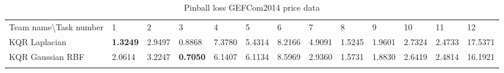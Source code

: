\begin{table}[!ht]
    \centering
    \caption{Pinball loss GEFCom2014 price data}
    \label{tab:pinball loss gefcom2014 price data}
    \begin{adjustbox}{width=\textwidth}
    \begin{tabular}{lllllllllllll}
      \toprule
      \midrule
      Team name\textbackslash Task number                       & 1                               & 2                                  & 3                               & 4                              & 5                              & 6       & 7                               & 8       & 9       & 10                             & 11                             & 12               \\
  KQR Laplacian
  &
  \textbf{1.3249}
  &
  2.9497
  &
  0.8868
  &
  7.3780
  &
  5.4314
  &
  8.2166
  &
  4.9091
  &
  1.5245
  &
  1.9601
  &
  2.7324
  &
  2.4733
  &
  17.5371
  \\
  KQR Gaussian RBF
  &
  2.0614
  &
  3.2247
  &
  \textbf{0.7050}
  &
  6.1407
  &
  6.1134
  &
  8.5969
  &
  2.9360
  &
  1.5731
  &
  1.8830
  &
  2.6419
  &
  2.4814
  &
  16.1921
  \\
  \\
  

\end{tabular}
\end{adjustbox}
\end{table}
